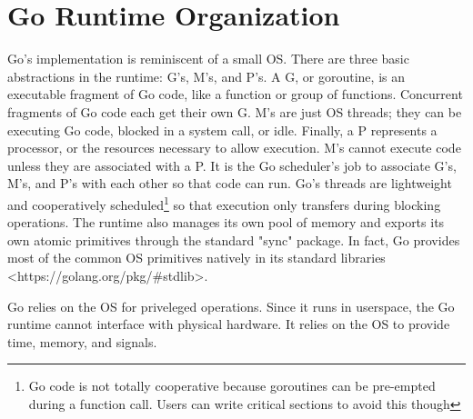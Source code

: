 \section{Go Runtime Organization}
Go's implementation is reminiscent of a small OS. There are three basic
abstractions in the runtime: G's, M's, and P's. A G, or goroutine, is an
executable fragment of Go code, like a function or group of functions. Concurrent fragments of Go code each get their
own G. M's are just OS threads; they can be executing Go code, blocked in a system call,
or idle. Finally, a P represents a processor, or the resources necessary to
allow execution. M's cannot execute code unless they are associated with a P.
It is the Go scheduler's job to associate G's, M's, and P's with each other so
that code can run. Go's threads are lightweight and
cooperatively scheduled\footnote{Go code is not totally cooperative because goroutines can be pre-empted during a function call. Users can write critical sections to avoid this though}
so that execution only transfers during
blocking operations. The runtime also manages its own pool of memory
and exports its own atomic primitives through the standard "sync"
package. In fact, Go provides most of the common OS primitives natively
in its standard libraries <https://golang.org/pkg/\#stdlib>.

Go relies on the OS for priveleged operations. Since it runs in userspace,
the Go runtime cannot interface with physical hardware. It relies on the OS
to provide time, memory, and signals.



